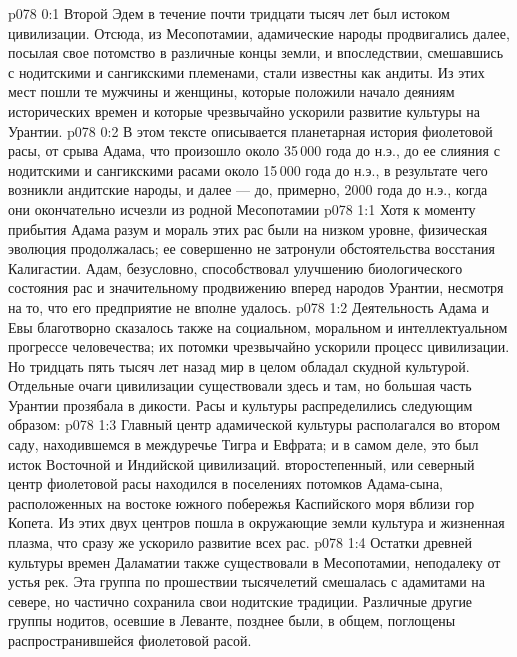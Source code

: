 \author{Архангел}
\vs p078 0:1 Второй Эдем в течение почти тридцати тысяч лет был истоком цивилизации. Отсюда, из Месопотамии, адамические народы продвигались далее, посылая свое потомство в различные концы земли, и впоследствии, смешавшись с нодитскими и сангикскими племенами, стали известны как андиты. Из этих мест пошли те мужчины и женщины, которые положили начало деяниям исторических времен и которые чрезвычайно ускорили развитие культуры на Урантии.
\vs p078 0:2 В этом тексте описывается планетарная история фиолетовой расы, от срыва Адама, что произошло около 35\,000 года до н.э., до ее слияния с нодитскими и сангикскими расами около 15\,000 года до н.э., в результате чего возникли андитские народы, и далее --- до, примерно, 2000 года до н.э., когда они окончательно исчезли из родной Месопотамии
\vs p078 1:1 Хотя к моменту прибытия Адама разум и мораль этих рас были на низком уровне, физическая эволюция продолжалась; ее совершенно не затронули обстоятельства восстания Калигастии. Адам, безусловно, способствовал улучшению биологического состояния рас и значительному продвижению вперед народов Урантии, несмотря на то, что его предприятие не вполне удалось.
\vs p078 1:2 Деятельность Адама и Евы благотворно сказалось также на социальном, моральном и интеллектуальном прогрессе человечества; их потомки чрезвычайно ускорили процесс цивилизации. Но тридцать пять тысяч лет назад мир в целом обладал скудной культурой. Отдельные очаги цивилизации существовали здесь и там, но большая часть Урантии прозябала в дикости. Расы и культуры распределились следующим образом:
\vs p078 1:3 \bibnobreakspace {} Главный центр адамической культуры располагался во втором саду, находившемся в междуречье Тигра и Евфрата; и в самом деле, это был исток Восточной и Индийской цивилизаций. второстепенный, или северный центр фиолетовой расы находился в поселениях потомков Адама\hyp{}сына, расположенных на востоке южного побережья Каспийского моря вблизи гор Копета. Из этих двух центров пошла в окружающие земли культура и жизненная плазма, что сразу же ускорило развитие всех рас.
\vs p078 1:4 \pc {}\bibnobreakspace {} Остатки древней культуры времен Даламатии также существовали в Месопотамии, неподалеку от устья рек. Эта группа по прошествии тысячелетий смешалась с адамитами на севере, но частично сохранила свои нодитские традиции. Различные другие группы нодитов, осевшие в Леванте, позднее были, в общем, поглощены распространившейся фиолетовой расой.
